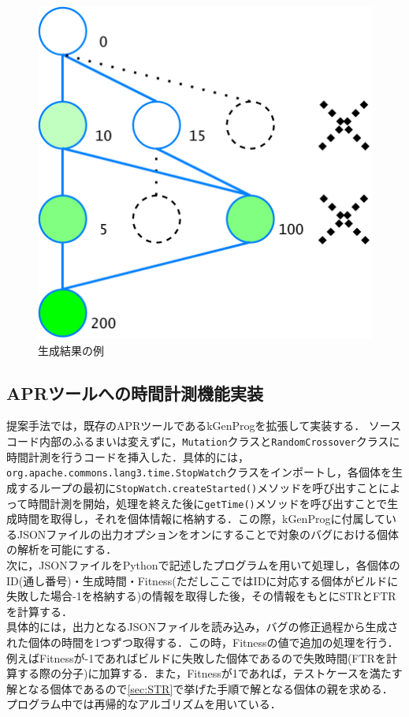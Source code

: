 \documentclass[uplatex,dvipdfmx,a4paper]{jsarticle}
\let\oldcite\cite
\renewcommand{\cite}[1]{\xspace\oldcite{#1}}
\begin{document}
\begin{figure}[t]
  \centering
  \includegraphics[width=\linewidth]{fig/astSample_STR.pdf}
  \caption{生成結果の例}
  \label{fig:example_STR}
\end{figure}
\subsection{APRツールへの時間計測機能実装} \label{sec:impl}
提案手法では，既存のAPRツールであるkGenProg\cite{higo2018kgenprog}を拡張して実装する．
ソースコード内部のふるまいは変えずに，\texttt{Mutation}クラスと\texttt{RandomCrossover}クラスに時間計測を行うコードを挿入した．具体的には，\texttt{org.apache.commons.lang3.time.StopWatch}クラスをインポートし，各個体を生成するループの最初に\texttt{StopWatch.createStarted()}メソッドを呼び出すことによって時間計測を開始，処理を終えた後に\texttt{getTime()}メソッドを呼び出すことで生成時間を取得し，それを個体情報に格納する．この際，kGenProgに付属しているJSONファイルの出力オプションをオンにすることで対象のバグにおける個体の解析を可能にする．\\
次に，JSONファイルをPythonで記述したプログラムを用いて処理し，各個体のID(通し番号)・生成時間・Fitness(ただしここではIDに対応する個体がビルドに失敗した場合-1を格納する)の情報を取得した後，その情報をもとにSTRとFTRを計算する．\\
具体的には，出力となるJSONファイルを読み込み，バグの修正過程から生成された個体の時間を1つずつ取得する．この時，Fitnessの値で追加の処理を行う．例えばFitnessが-1であればビルドに失敗した個体であるので失敗時間(FTRを計算する際の分子)に加算する．また，Fitnessが1であれば，テストケースを満たす解となる個体であるので\ref{sec:STR}で挙げた手順で解となる個体の親を求める．プログラム中では再帰的なアルゴリズムを用いている．\\
\clearpage
\end{document}
